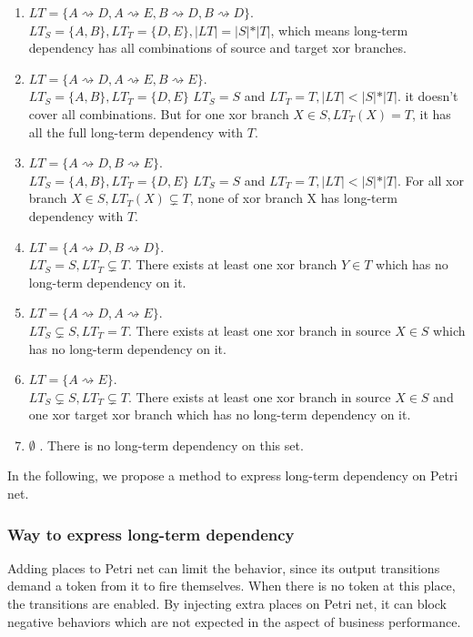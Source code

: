\begin{enumerate}
	\item $LT=\{ A\rightsquigarrow D, A\rightsquigarrow E, B\rightsquigarrow D, B\rightsquigarrow D\}$. \\
	$LT_S = \{A,B\}, LT_T=\{D,E\}, \vert LT \vert = \vert S \vert * \vert T \vert  $, which means long-term dependency has all combinations of source and target xor branches. 
	\item $LT=\{ A\rightsquigarrow D, A\rightsquigarrow E, B\rightsquigarrow E\}. $\\
	$LT_S = \{A,B\}, LT_T=\{D,E\}$
	$LT_S = S $ and $LT_T = T, \vert LT \vert < \vert S \vert * \vert T \vert $. it doesn't cover all combinations. But for one xor branch $X \in S, LT_T(X)= T$, it has all the full long-term dependency with $T$. 
	\item $LT=\{ A\rightsquigarrow D, B\rightsquigarrow E\}. $\\
	$LT_S = \{A,B\}, LT_T=\{D,E\}$
	$LT_S = S $ and $LT_T = T, \vert LT \vert < \vert S \vert * \vert T \vert $. For all xor branch $X \in S, LT_T(X) \subsetneq T$, none of xor branch X has long-term dependency with $T$.
	\item $LT=\{ A\rightsquigarrow D, B\rightsquigarrow D\}.$ \\
	$LT_S = S ,  LT_T \subsetneq T$. There exists at least one xor branch $Y \in T$ which has no long-term dependency on it.
	\item $LT=\{ A\rightsquigarrow D, A\rightsquigarrow E\}.$ \\
	$LT_S \subsetneq S ,  LT_T = T$.
	There exists at least one xor branch in source $X \in S$ which has no long-term dependency on it.
	\item $LT=\{ A\rightsquigarrow E\}. $\\
	$LT_S \subsetneq S ,  LT_T \subsetneq T$.
	There exists at least one xor branch in source $X \in S$  and one xor target xor branch which has no long-term dependency on it.
	\item $ \emptyset$ . There is no long-term dependency on this set. 
\end{enumerate}
In the following, we propose a method to express long-term dependency on Petri net. 
\subsubsection{Way to express long-term dependency}
Adding places to Petri net can limit the behavior\cite{bergenthum2007process}, since its output transitions demand a token from it to fire themselves. When there is no token at this place, the transitions are enabled. By injecting extra places on Petri net, it can block negative behaviors which are not expected in the aspect of business performance. 

